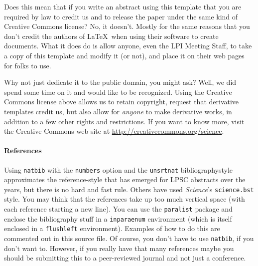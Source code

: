 \documentclass[twoside]{article}
\begin{document}
Does this mean that if you write an abstract using this template that
you are required by law to credit us and to release the paper under
the same kind of Creative Commons license?  No, it doesn't.  Mostly
for the same reasons that you don't credit the authors of \LaTeX\
when using their software to create documents.  What it does do is allow
anyone, even the LPI Meeting Staff, to take a copy of this template
and modify it (or not), and place it on their web pages for folks
to use.

Why not just dedicate it to the public domain, you might ask?  Well,
we did spend some time on it and would like to be recognized.  Using
the Creative Commons license above allows us to retain copyright,
request that derivative templates credit us, but also allow for
\emph{anyone} to make derivative works, in addition to a few other
rights and restrictions.  If you want to know more, visit the
Creative Commons web site at \url{http://creativecommons.org/science}.


\paragraph{References}

Using \texttt{natbib} with the \texttt{numbers} option and the
\texttt{unsrtnat} bibliographystyle approximates the reference-style
that has emerged for LPSC abstracts over the years, but there is
no hard and fast rule.  Others have used \emph{Science}'s
\texttt{science.bst} style. You may think that the references take
up too much vertical space (with each reference starting a new
line).  You can use the \texttt{paralist} package and enclose the
bibliography stuff in a \texttt{inparaenum} environment (which is
itself enclosed in a \texttt{flushleft} environment).  Examples of
how to do this are commented out in this source file.  Of course,
you don't have to use \texttt{natbib}, if you don't want to.  However,
if you really have that many references maybe you should be submitting
this to a peer-reviewed journal and not just a conference.


\printbibliography

%
%

\end{document}
